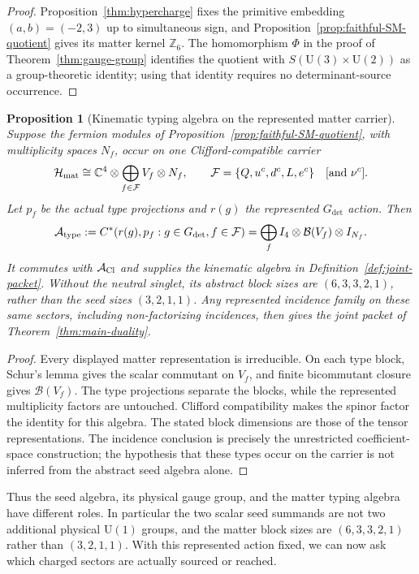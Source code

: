 \documentclass[11pt]{article}
\numberwithin{equation}{section}
\newtheorem{proposition}[theorem]{Proposition}
\theoremstyle{definition}
\theoremstyle{remark}
\newcommand{\Z}{\mathbb Z}
\newcommand{\C}{\mathbb C}
\newcommand{\U}{\mathrm U}
\newcommand{\A}{\mathcal A}
\newcommand{\Hh}{\mathcal H}
\begin{document}
\begin{proof}
Proposition~\ref{thm:hypercharge} fixes the primitive embedding
$(a,b)=(-2,3)$ up to simultaneous sign, and
Proposition~\ref{prop:faithful-SM-quotient} gives its matter kernel $\Z_6$.
The homomorphism $\Phi$ in the proof of Theorem~\ref{thm:gauge-group}
identifies the quotient with $S(\U(3)\times\U(2))$ as a group-theoretic
identity; using that identity requires no determinant-source occurrence.
\end{proof}

\begin{proposition}[Kinematic typing algebra on the represented matter carrier]
\label{prop:typed-matter-lift}
Suppose the fermion modules of Proposition~\ref{prop:faithful-SM-quotient},
with multiplicity spaces $N_f$, occur on one Clifford-compatible carrier
\[
 \Hh_{\rm mat}\cong\C^4\otimes
       \bigoplus_{f\in\mathcal F}V_f\otimes N_f,
 \qquad \mathcal F=\{Q,u^c,d^c,L,e^c\}\quad[\text{and }\nu^c].
\]
Let $p_f$ be the actual type projections and $r(g)$ the represented
$G_{\det}$ action.  Then
\begin{equation}
 \A_{\rm type}:=C^*(r(g),p_f:g\in G_{\det},f\in\mathcal F)
 =\bigoplus_f I_4\otimes\mathcal B(V_f)\otimes I_{N_f}.
 \label{eq:typed-matter-lift}
\end{equation}
It commutes with $\A_{\rm Cl}$ and supplies the kinematic algebra in
Definition~\ref{def:joint-packet}.  Without the neutral singlet, its
abstract block sizes are $(6,3,3,2,1)$, rather than the seed sizes
$(3,2,1,1)$.  Any represented incidence family on these same sectors,
including non-factorizing incidences, then gives the joint packet of
Theorem~\ref{thm:main-duality}.
\end{proposition}

\begin{proof}
Every displayed matter representation is irreducible.  On each type block,
Schur's lemma gives the scalar commutant on $V_f$, and finite bicommutant
closure gives $\mathcal B(V_f)$.  The type projections separate the blocks,
while the represented multiplicity factors are untouched.  Clifford
compatibility makes the spinor factor the identity for this algebra.  The
stated block dimensions are those of the tensor representations.  The
incidence conclusion is precisely the unrestricted coefficient-space
construction; the hypothesis that these types occur on the carrier is not
inferred from the abstract seed algebra alone.
\end{proof}

Thus the seed algebra, its physical gauge group, and the matter typing
algebra have different roles.  In particular the two scalar seed summands
are not two additional physical $\U(1)$ groups, and the matter block sizes
are $(6,3,3,2,1)$ rather than $(3,2,1,1)$.  With this represented action
fixed, we can now ask which charged sectors are actually sourced or reached.
\end{document}
